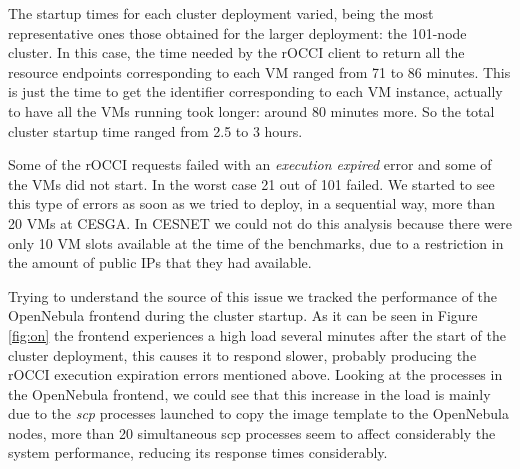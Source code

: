 
The startup times for each cluster deployment varied, being the most representative ones those obtained for the larger deployment: the 101-node cluster. In this case, the time needed by the rOCCI client to return all the resource endpoints corresponding to each VM ranged from 71 to 86 minutes. This is just the time to get the identifier corresponding to each VM instance, actually to have all the VMs running took longer: around 80 minutes more. So the total cluster startup time ranged from 2.5 to 3 hours. 

Some of the rOCCI requests failed with an \emph{execution expired} error and some of the VMs did not start. In the worst case 21 out of 101 failed.
We started to see this type of errors as soon as we tried to deploy, in a sequential way, more than 20 VMs at CESGA. In CESNET we could not do this analysis because there were only 10 VM slots available at the time of the benchmarks, due to a restriction in the amount of public IPs that they had available.

Trying to understand the source of this issue we tracked the performance of the OpenNebula frontend during the cluster startup. As it can be seen in Figure \ref{fig:on} the frontend experiences a high load several minutes after the start of the cluster deployment, this causes it to respond slower, probably producing the rOCCI execution expiration errors mentioned above. Looking at the processes in the OpenNebula frontend, we could see that this increase in the load is mainly due to the \emph{scp} processes launched to copy the image template to the OpenNebula nodes, more than 20 simultaneous scp processes seem to affect considerably the system performance, reducing its response times considerably.

%
%
%
%

